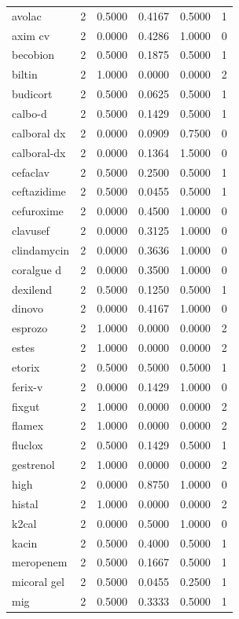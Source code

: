 \begin{longtable}{p{3.0cm}rrrrr}
avolac & 2 & 0.5000 & 0.4167 & 0.5000 & 1 \\
axim cv & 2 & 0.0000 & 0.4286 & 1.0000 & 0 \\
becobion & 2 & 0.5000 & 0.1875 & 0.5000 & 1 \\
biltin & 2 & 1.0000 & 0.0000 & 0.0000 & 2 \\
budicort & 2 & 0.5000 & 0.0625 & 0.5000 & 1 \\
calbo-d & 2 & 0.5000 & 0.1429 & 0.5000 & 1 \\
calboral dx & 2 & 0.0000 & 0.0909 & 0.7500 & 0 \\
calboral-dx & 2 & 0.0000 & 0.1364 & 1.5000 & 0 \\
cefaclav & 2 & 0.5000 & 0.2500 & 0.5000 & 1 \\
ceftazidime & 2 & 0.5000 & 0.0455 & 0.5000 & 1 \\
cefuroxime & 2 & 0.0000 & 0.4500 & 1.0000 & 0 \\
clavusef & 2 & 0.0000 & 0.3125 & 1.0000 & 0 \\
clindamycin & 2 & 0.0000 & 0.3636 & 1.0000 & 0 \\
coralgue d & 2 & 0.0000 & 0.3500 & 1.0000 & 0 \\
dexilend & 2 & 0.5000 & 0.1250 & 0.5000 & 1 \\
dinovo & 2 & 0.0000 & 0.4167 & 1.0000 & 0 \\
esprozo & 2 & 1.0000 & 0.0000 & 0.0000 & 2 \\
estes & 2 & 1.0000 & 0.0000 & 0.0000 & 2 \\
etorix & 2 & 0.5000 & 0.5000 & 0.5000 & 1 \\
ferix-v & 2 & 0.0000 & 0.1429 & 1.0000 & 0 \\
fixgut & 2 & 1.0000 & 0.0000 & 0.0000 & 2 \\
flamex & 2 & 1.0000 & 0.0000 & 0.0000 & 2 \\
fluclox & 2 & 0.5000 & 0.1429 & 0.5000 & 1 \\
gestrenol & 2 & 1.0000 & 0.0000 & 0.0000 & 2 \\
high & 2 & 0.0000 & 0.8750 & 1.0000 & 0 \\
histal & 2 & 1.0000 & 0.0000 & 0.0000 & 2 \\
k2cal & 2 & 0.0000 & 0.5000 & 1.0000 & 0 \\
kacin & 2 & 0.5000 & 0.4000 & 0.5000 & 1 \\
meropenem & 2 & 0.5000 & 0.1667 & 0.5000 & 1 \\
micoral gel & 2 & 0.5000 & 0.0455 & 0.2500 & 1 \\
mig & 2 & 0.5000 & 0.3333 & 0.5000 & 1 \\

\end{longtable}
